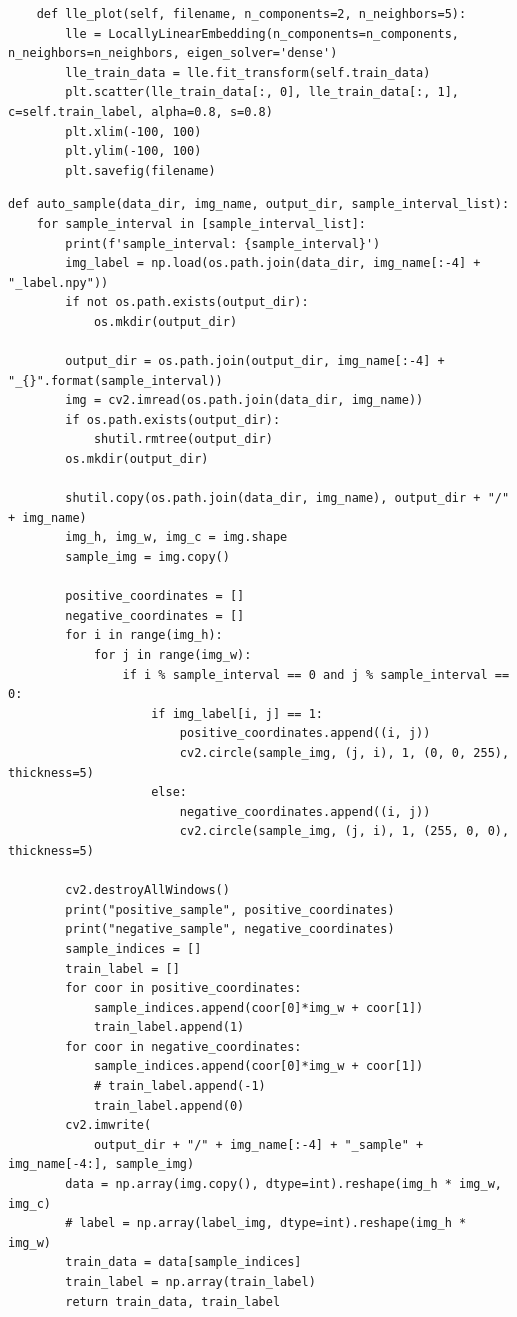 \documentclass[12pt,hyperref,a4paper,UTF8]{ctexart}
\begin{document}
{{\begin{mdframed}[style=codebox]
\begin{lstlisting}
    def lle_plot(self, filename, n_components=2, n_neighbors=5):
        lle = LocallyLinearEmbedding(n_components=n_components, n_neighbors=n_neighbors, eigen_solver='dense')
        lle_train_data = lle.fit_transform(self.train_data)
        plt.scatter(lle_train_data[:, 0], lle_train_data[:, 1], c=self.train_label, alpha=0.8, s=0.8)
        plt.xlim(-100, 100)
        plt.ylim(-100, 100)
        plt.savefig(filename)
\end{lstlisting}
\end{mdframed}

\begin{mdframed}[style=codebox]
\begin{lstlisting}
def auto_sample(data_dir, img_name, output_dir, sample_interval_list):
    for sample_interval in [sample_interval_list]:
        print(f'sample_interval: {sample_interval}')
        img_label = np.load(os.path.join(data_dir, img_name[:-4] + "_label.npy"))
        if not os.path.exists(output_dir):
            os.mkdir(output_dir)

        output_dir = os.path.join(output_dir, img_name[:-4] + "_{}".format(sample_interval))
        img = cv2.imread(os.path.join(data_dir, img_name))
        if os.path.exists(output_dir):
            shutil.rmtree(output_dir)
        os.mkdir(output_dir)

        shutil.copy(os.path.join(data_dir, img_name), output_dir + "/" + img_name)
        img_h, img_w, img_c = img.shape
        sample_img = img.copy()

        positive_coordinates = []
        negative_coordinates = []
        for i in range(img_h):
            for j in range(img_w):
                if i % sample_interval == 0 and j % sample_interval == 0:
                    if img_label[i, j] == 1:
                        positive_coordinates.append((i, j))
                        cv2.circle(sample_img, (j, i), 1, (0, 0, 255), thickness=5)
                    else:
                        negative_coordinates.append((i, j))
                        cv2.circle(sample_img, (j, i), 1, (255, 0, 0), thickness=5)

        cv2.destroyAllWindows()
        print("positive_sample", positive_coordinates)
        print("negative_sample", negative_coordinates)
        sample_indices = []
        train_label = []
        for coor in positive_coordinates:
            sample_indices.append(coor[0]*img_w + coor[1])
            train_label.append(1)
        for coor in negative_coordinates:
            sample_indices.append(coor[0]*img_w + coor[1])
            # train_label.append(-1)
            train_label.append(0)
        cv2.imwrite(
            output_dir + "/" + img_name[:-4] + "_sample" + img_name[-4:], sample_img)
        data = np.array(img.copy(), dtype=int).reshape(img_h * img_w, img_c)
        # label = np.array(label_img, dtype=int).reshape(img_h * img_w)
        train_data = data[sample_indices]
        train_label = np.array(train_label)
        return train_data, train_label



\end{lstlisting}
\end{mdframed}}}
\end{document}
